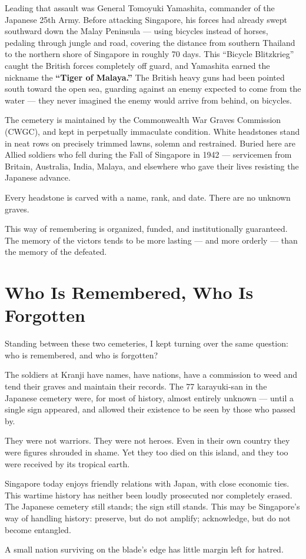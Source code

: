 Leading that assault was General Tomoyuki Yamashita, commander of the Japanese 25th Army. Before attacking Singapore, his forces had already swept southward down the Malay Peninsula --- using bicycles instead of horses, pedaling through jungle and road, covering the distance from southern Thailand to the northern shore of Singapore in roughly 70 days. This ``Bicycle Blitzkrieg'' caught the British forces completely off guard, and Yamashita earned the nickname the \textbf{``Tiger of Malaya.''} The British heavy guns had been pointed south toward the open sea, guarding against an enemy expected to come from the water --- they never imagined the enemy would arrive from behind, on bicycles.

The cemetery is maintained by the Commonwealth War Graves Commission (CWGC), and kept in perpetually immaculate condition. White headstones stand in neat rows on precisely trimmed lawns, solemn and restrained. Buried here are Allied soldiers who fell during the Fall of Singapore in 1942 --- servicemen from Britain, Australia, India, Malaya, and elsewhere who gave their lives resisting the Japanese advance.

Every headstone is carved with a name, rank, and date. There are no unknown graves.

This way of remembering is organized, funded, and institutionally guaranteed. The memory of the victors tends to be more lasting --- and more orderly --- than the memory of the defeated.

\section{Who Is Remembered, Who Is Forgotten}

Standing between these two cemeteries, I kept turning over the same question: who is remembered, and who is forgotten?

The soldiers at Kranji have names, have nations, have a commission to weed and tend their graves and maintain their records. The 77 karayuki-san in the Japanese cemetery were, for most of history, almost entirely unknown --- until a single sign appeared, and allowed their existence to be seen by those who passed by.

They were not warriors. They were not heroes. Even in their own country they were figures shrouded in shame. Yet they too died on this island, and they too were received by its tropical earth.

Singapore today enjoys friendly relations with Japan, with close economic ties. This wartime history has neither been loudly prosecuted nor completely erased. The Japanese cemetery still stands; the sign still stands. This may be Singapore's way of handling history: preserve, but do not amplify; acknowledge, but do not become entangled.

A small nation surviving on the blade's edge has little margin left for hatred.
